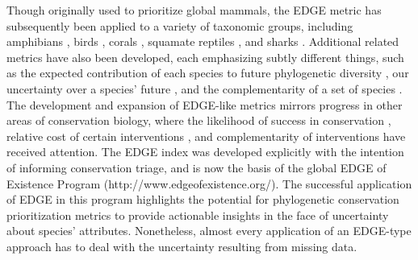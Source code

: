 \documentclass[12pt,english]{article}
\begin{document}
Though originally used to prioritize global mammals, the EDGE metric has
subsequently been applied to a variety of taxonomic groups, including amphibians
\autocite{Isaac2012}, birds \autocite{Jetz2014}, corals \autocite{Curnick2015},
squamate reptiles \autocite{Tonini2016}, and sharks \autocite{Stein2018}.
Additional related metrics have also been developed, each emphasizing subtly
different things, such as the expected contribution of each species to future
phylogenetic diversity \autocite[HEDGE, I-HEDGE;][]{Steel2007,Jensen2016}, our
uncertainty over a species' future \autocite[EDAM;][]{Pearse2015}, and the
complementarity of a set of species \autocite{Faith2008}. The development and
expansion of EDGE-like metrics mirrors progress in other areas of conservation
biology, where the likelihood of success in conservation \autocite{Wilson2007,
Mcbride2007}, relative cost of certain interventions \autocite{Naidoo2006}, and
complementarity of interventions \autocite{Pressey1993, Myers2000} have received
attention. The EDGE index was developed explicitly with the intention of
informing conservation triage, and is now the basis of the global EDGE of
Existence Program (http://www.edgeofexistence.org/). The successful application
of EDGE in this program highlights the potential for phylogenetic conservation
prioritization metrics to provide actionable insights in the face of uncertainty
about species’ attributes. Nonetheless, almost every application of an EDGE-type
approach has to deal with the uncertainty resulting from missing data.
\end{document}
